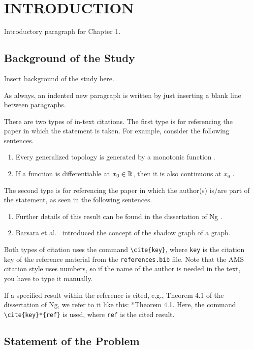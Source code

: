 \chapter{INTRODUCTION}

Introductory paragraph for Chapter 1.

\section{Background of the Study}

Insert background of the study here.

As always, an indented new paragraph is written by just inserting a blank line between paragraphs.

There are two types of in-text citations. The first type is for referencing the paper in which the statement is taken. For example, consider the following sentences.
\begin{enumerate}
	\item Every generalized topology is generated by a monotonic function \cite{JlEx}.
	\item If a function is differentiable at $x_0\in\mathbb{R}$, then it is also continuous at $x_0$ \cite{BkEx}.
\end{enumerate}

The second type is for referencing the paper in which the author(s) is/are part of the statement, as seen in the following sentences.
\begin{enumerate}
	\item Further details of this result can be found in the dissertation of Ng \cite{ThEx}.
	\item Barsara et al.~\cite{bvv11} introduced the concept of the shadow graph of a graph.
\end{enumerate}

Both types of citation uses the command \texttt{\textbackslash cite\{key\}}, where \texttt{key} is the citation key of the reference material from the \texttt{references.bib} file. Note that the AMS citation style uses numbers, so if the name of the author is needed in the text, you have to type it manually.

If a specified result within the reference is cited, e.g., Theorem 4.1 of the dissertation of Ng, we refer to it like this: \cite{ThEx}*{Theorem 4.1}. Here, the command \texttt{\textbackslash cite\{key\}*\{ref\}} is used, where \texttt{ref} is the cited result.

\section{Statement of the Problem}

